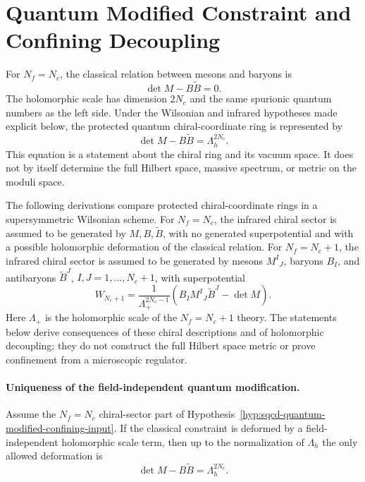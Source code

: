 \section{Quantum Modified Constraint and Confining Decoupling}

For \(N_f=N_c\), the classical relation between mesons and baryons is
\[
  \det M-B\widetilde B=0 .
\]
The holomorphic scale has dimension \(2N_c\) and the same spurionic quantum
numbers as the left side.  Under the Wilsonian and infrared hypotheses made
explicit below, the protected quantum chiral-coordinate ring is represented by
\[
  \det M-B\widetilde B=\Lambda_h^{2N_c}.
\]
This equation is a statement about the chiral ring and its vacuum space.  It
does not by itself determine the full Hilbert space, massive spectrum, or
metric on the moduli space.

\begin{hypothesis}[\(N_f=N_c\) and \(N_f=N_c+1\) chiral-sector descriptions]
\label{hyp:sqcd-quantum-modified-confining-input}
The following derivations compare protected chiral-coordinate rings in a
supersymmetric Wilsonian scheme.  For \(N_f=N_c\), the infrared chiral
sector is assumed to be generated by \(M,B,\widetilde B\), with no generated
superpotential and with a possible holomorphic deformation of the classical
relation.  For \(N_f=N_c+1\), the infrared chiral sector is assumed to be
generated by mesons \(M^I{}_J\), baryons \(B_I\), and antibaryons
\(\widetilde B^J\), \(I,J=1,\ldots,N_c+1\), with superpotential
\begin{equation}
  W_{N_c+1}
  =
  \frac{1}{\Lambda_{+}^{2N_c-1}}
  \left(B_I M^I{}_J\widetilde B^J-\det M\right).
  \label{eq:sqcd-nc-plus-one-confining-superpotential}
\end{equation}
Here \(\Lambda_{+}\) is the holomorphic scale of the \(N_f=N_c+1\) theory.
The statements below derive consequences of these chiral descriptions and of
holomorphic decoupling; they do not construct the full Hilbert space metric
or prove confinement from a microscopic regulator.
\end{hypothesis}

\paragraph{Uniqueness of the field-independent quantum modification.}
Assume the \(N_f=N_c\) chiral-sector part of
Hypothesis~\ref{hyp:sqcd-quantum-modified-confining-input}.  If the
classical constraint is deformed by a field-independent holomorphic scale
term, then up to the normalization of \(\Lambda_h\) the only allowed
deformation is
\[
  \det M-B\widetilde B=\Lambda_h^{2N_c}.
\]

